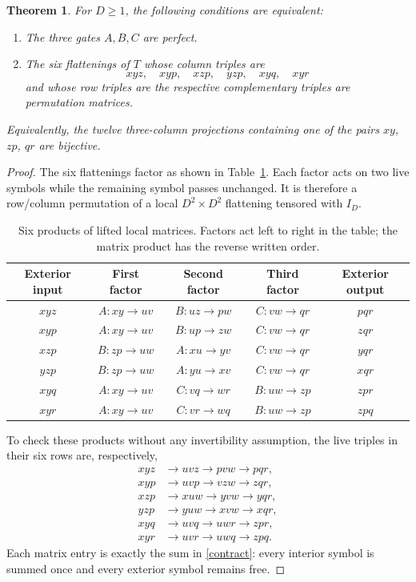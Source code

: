 \documentclass[11pt]{article}
\newtheorem{theorem}{Theorem}
\begin{document}
\begin{theorem}\label{six}
For $D\ge1$, the following conditions are equivalent:
\begin{enumerate}
\item The three gates $A,B,C$ are perfect.
\item The six flattenings of $T$ whose column triples are
\[
 xyz,\quad xyp,\quad xzp,\quad yzp,\quad xyq,\quad xyr
\]
and whose row triples are the respective complementary triples are
permutation matrices.
\end{enumerate}
Equivalently, the twelve three-column projections containing one of the
pairs $xy$, $zp$, $qr$ are bijective.
\end{theorem}
\begin{proof}
The six flattenings factor as shown in Table~\ref{cuts}. Each factor
acts on two live symbols while the remaining symbol passes unchanged.
It is therefore a row/column permutation of a local $D^2\times D^2$
flattening tensored with $I_D$.

\begin{table}[ht]
\centering\small
\begin{tabular}{@{}ccccc@{}}
\toprule
Exterior input & First factor & Second factor & Third factor & Exterior output\\
\midrule
$xyz$ & $A:xy\to uv$ & $B:uz\to pw$ & $C:vw\to qr$ & $pqr$\\
$xyp$ & $A:xy\to uv$ & $B:up\to zw$ & $C:vw\to qr$ & $zqr$\\
$xzp$ & $B:zp\to uw$ & $A:xu\to yv$ & $C:vw\to qr$ & $yqr$\\
$yzp$ & $B:zp\to uw$ & $A:yu\to xv$ & $C:vw\to qr$ & $xqr$\\
$xyq$ & $A:xy\to uv$ & $C:vq\to wr$ & $B:uw\to zp$ & $zpr$\\
$xyr$ & $A:xy\to uv$ & $C:vr\to wq$ & $B:uw\to zp$ & $zpq$\\
\bottomrule
\end{tabular}
\caption{Six products of lifted local matrices. Factors act left to right
in the table; the matrix product has the reverse written order.}\label{cuts}
\end{table}

To check these products without any invertibility assumption, the live
triples in their six rows are, respectively,
\begin{align*}
xyz&\longrightarrow uvz\longrightarrow pvw\longrightarrow pqr,\\
xyp&\longrightarrow uvp\longrightarrow vzw\longrightarrow zqr,\\
xzp&\longrightarrow xuw\longrightarrow yvw\longrightarrow yqr,\\
yzp&\longrightarrow yuw\longrightarrow xvw\longrightarrow xqr,\\
xyq&\longrightarrow uvq\longrightarrow uwr\longrightarrow zpr,\\
xyr&\longrightarrow uvr\longrightarrow uwq\longrightarrow zpq.
\end{align*}
Each matrix entry is exactly the sum in \eqref{contract}: every interior
symbol is summed once and every exterior symbol remains free.


\end{proof}
\end{document}

